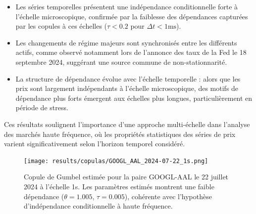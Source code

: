\documentclass[12pt,a4paper]{article}
\theoremstyle{definition}
\theoremstyle{remark}
\begin{document}
\begin{itemize}
    \item Les séries temporelles présentent une indépendance conditionnelle forte à l'échelle microscopique, confirmée par la faiblesse des dépendances capturées par les copules à ces échelles ($\tau < 0.2$ pour $\Delta t < 1\text{ms}$).
    
    \item Les changements de régime majeurs sont synchronisés entre les différents actifs, comme observé notamment lors de l'annonce des taux de la Fed le 18 septembre 2024, suggérant une source commune de non-stationnarité.
    
    \item La structure de dépendance évolue avec l'échelle temporelle : alors que les prix sont largement indépendants à l'échelle microscopique, des motifs de dépendance plus forts émergent aux échelles plus longues, particulièrement en période de stress.
\end{itemize}

Ces résultats soulignent l'importance d'une approche multi-échelle dans l'analyse des marchés haute fréquence, où les propriétés statistiques des séries de prix varient significativement selon l'horizon temporel considéré.

\begin{figure}[h!]
    \centering
    \texttt{[image: results/copulas/GOOGL\_AAL\_2024-07-22\_1s.png]}
    \caption{Copule de Gumbel estimée pour la paire GOOGL-AAL le 22 juillet 2024 à l'échelle 1s. Les paramètres estimés montrent une faible dépendance ($\theta = 1.005$, $\tau = 0.005$), cohérente avec l'hypothèse d'indépendance conditionnelle à haute fréquence.}
    \label{fig:copula_example}
\end{figure}
\end{document}
